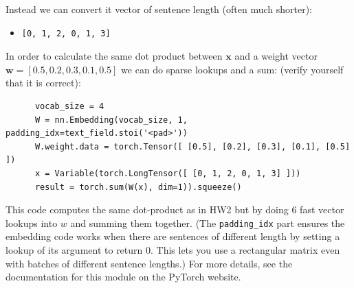 \documentclass[10pt]{harvardml}
\theoremstyle{plain}
\begin{document}
Instead we can convert it vector of sentence length (often much shorter):
\begin{itemize}
\item \begin{verbatim}[0, 1, 2, 0, 1, 3]\end{verbatim}
\end{itemize}

\noindent In order to calculate the same dot product between $\mathbf{x}$ and a weight vector $\mathbf{w}=[0.5,0.2,0.3,0.1,0.5]$ we can do sparse lookups and a sum:
(verify yourself that it is correct):
  \begin{verbatim}
      vocab_size = 4
      W = nn.Embedding(vocab_size, 1, padding_idx=text_field.stoi('<pad>'))
      W.weight.data = torch.Tensor([ [0.5], [0.2], [0.3], [0.1], [0.5] ])
      x = Variable(torch.LongTensor([ [0, 1, 2, 0, 1, 3] ]))
      result = torch.sum(W(x), dim=1)).squeeze()
  \end{verbatim}

This code computes the same dot-product as in HW2 but by doing 6 fast vector lookups
into $w$ and summing them together. (The \texttt{padding\_idx} part ensures
the embedding code works when there are sentences of different length by setting
a lookup of its argument to return 0. This lets you use a rectangular matrix even
with batches of different sentence lengths.) For more details, see the documentation for this module on the PyTorch website.
\end{document}
